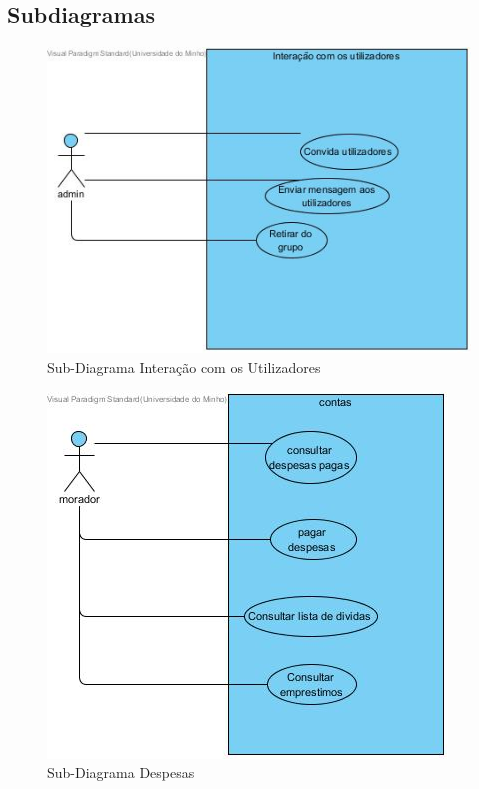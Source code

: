 \subsection{Subdiagramas}

\begin{figure}[htb!]
	\centering
	\includegraphics[scale=0.5]{InteracaoComOsUtilizadores}  
	\caption{Sub-Diagrama Interação com os Utilizadores }  
\end{figure}


\begin{figure}[htb!]
	\centering
	\includegraphics[scale=0.5]{despesasMorador}  
	\caption{Sub-Diagrama Despesas }  
\end{figure}


